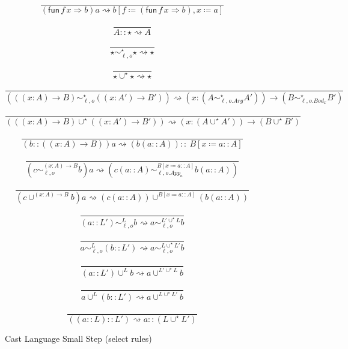 \begin{figure}
\[
\frac{\ }{\left(\mathsf{fun}\,f\,x\Rightarrow b\right)a\rightsquigarrow b\left[f\coloneqq\left(\mathsf{fun}\,f\,x\Rightarrow b\right),x\coloneqq a\right]}
\]

\[
\frac{\ }{A::\star\rightsquigarrow A}
\]

\[
\frac{\ }{\star\sim_{\ell,o}^{\star}\star\rightsquigarrow\star}
\]

\[
\frac{\ }{\star\cup^{\star}\star\rightsquigarrow\star}
\]

\[
\frac{\ }{\left(\left(\left(x:A\right)\rightarrow B\right)\sim_{\ell,o}^{\star}\left(\left(x:A'\right)\rightarrow B'\right)\right)\rightsquigarrow\left(x:\left(A\sim_{\ell,o.Arg}^{\star}A'\right)\right)\rightarrow\left(B\sim_{\ell,o.Bod_{x}}^{\star}B'\right)}
\]

\[
\frac{\ }{\left(\left(\left(x:A\right)\rightarrow B\right)\cup^{\star}\left(\left(x:A'\right)\rightarrow B'\right)\right)\rightsquigarrow\left(x:\left(A\cup^{\star}A'\right)\right)\rightarrow\left(B\cup^{\star}B'\right)}
\]

\[
\frac{\ }{\left(b::\left(\left(x:A\right)\rightarrow B\right)\right)a\rightsquigarrow\left(b\left(a::A\right)\right)::\ B\left[x\coloneqq a::A\right]}
\]

\[
\frac{\ }{\left(c\sim_{\ell,o}^{\left(x:A\right)\rightarrow B}b\right)a\rightsquigarrow\left(c\left(a::A\right)\sim_{\ell,o.App_{a}}^{B\left[x\coloneqq a::A\right]}b\left(a::A\right)\right)}
\]

\[
\frac{\ }{\left(c\cup^{\left(x:A\right)\rightarrow B}b\right)a\rightsquigarrow\left(c\left(a::A\right)\right)\cup^{B\left[x\coloneqq a::A\right]}\left(b\left(a::A\right)\right)}
\]

\[
\frac{\ }{\left(a::L'\right)\sim_{\ell,o}^{L}b\rightsquigarrow a\sim_{\ell,o}^{L'\cup^{\star}L}b}
\]

\[
\frac{\ }{a\sim_{\ell,o}^{L}\left(b::L'\right)\rightsquigarrow a\sim_{\ell,o}^{L\cup^{\star}L'}b}
\]

\[
\frac{\ }{\left(a::L'\right)\cup^{L}b\rightsquigarrow a\cup^{L'\cup^{\star}L}b}
\]

\[
\frac{\ }{a\cup^{L}\left(b::L'\right)\rightsquigarrow a\cup^{L\cup^{\star}L'}b}
\]

\[
\frac{\ }{\left(\left(a::L\right)::L'\right)\rightsquigarrow a::\left(L\cup^{\star}L'\right)}
\]
\caption{Cast Language Small Step (select rules)}
\label{fig:cast-data-step}
\end{figure}

